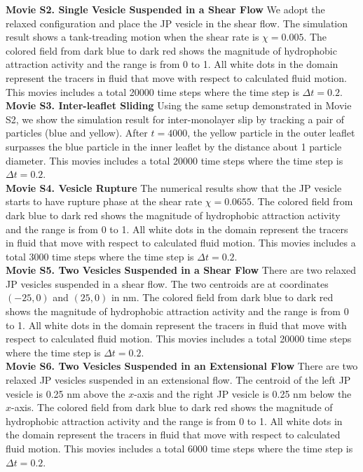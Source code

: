 \noindent
{\bf Movie S2. Single Vesicle Suspended in a Shear Flow} 
We adopt the relaxed configuration and place the JP vesicle in the shear flow. The simulation result shows a tank-treading motion when the shear rate is $\chi=0.005$.
The colored field from dark blue to dark red shows the magnitude of hydrophobic attraction activity and the range is from 0 to 1. All white dots in the domain represent the tracers in fluid that move with respect to calculated fluid motion.
This movies includes a total 20000 time steps where the time step is $\Delta t=0.2$.\\

\noindent
{\bf Movie S3. Inter-leaflet Sliding} 
Using the same setup demonstrated in Movie S2, we show the simulation result for 
inter-monolayer slip by tracking a pair of particles (blue and yellow). After $t=4000$, 
the yellow particle in the outer leaflet surpasses the blue particle in the inner leaflet by the distance about 1 particle diameter.
This movies includes a total 20000 time steps where the time step is $\Delta t=0.2$.\\


\noindent
{\bf Movie S4. Vesicle Rupture} 
The numerical results show that the JP vesicle starts to have rupture phase at the shear rate $\chi=0.0655$. The colored field from dark blue to dark red shows the magnitude of hydrophobic attraction activity and the range is from 0 to 1. All white dots in the domain represent the tracers in fluid that move with respect to calculated fluid motion. This movies includes a total 3000 time steps where the time step is $\Delta t=0.2$.\\


\noindent
{\bf Movie S5. Two Vesicles Suspended in a Shear Flow} 
There are two relaxed JP vesicles suspended in a shear flow. The two centroids are at coordinates $(-25,0)$ and $(25,0)$ in nm. The colored field from dark blue to dark red shows the magnitude of hydrophobic attraction activity and the range is from 0 to 1. All white dots in the domain represent the tracers in fluid that move with respect to calculated fluid motion. This movies includes a total 20000 time steps where the time step is $\Delta t=0.2$.\\


\noindent
{\bf Movie S6. Two Vesicles Suspended in an Extensional Flow} 
There are two relaxed JP vesicles suspended in an extensional flow. The centroid of the left JP vesicle is 0.25 nm above the $x$-axis and the right JP vesicle is 0.25 nm below the $x$-axis. The colored field from dark blue to dark red shows the magnitude of hydrophobic attraction activity and the range is from 0 to 1. All white dots in the domain represent the tracers in fluid that move with respect to calculated fluid motion.
This movies includes a total 6000 time steps where the time step is $\Delta t=0.2$.


